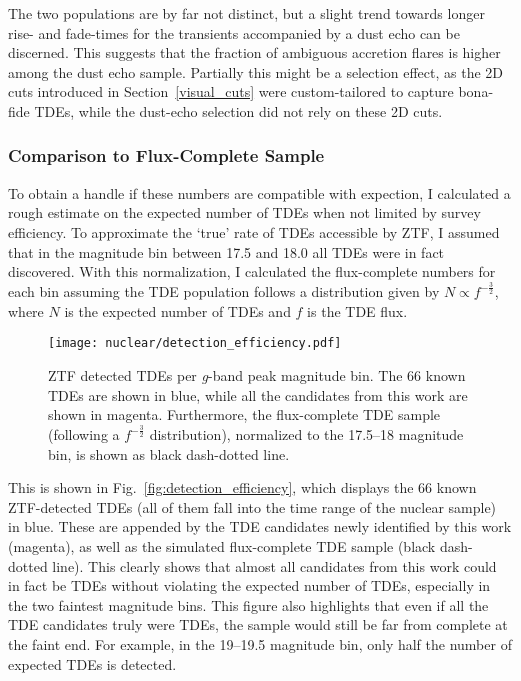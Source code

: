 The two populations are by far not distinct, but a slight trend towards longer rise- and fade-times for the transients accompanied by a dust echo can be discerned. This suggests that the fraction of ambiguous accretion flares is higher among the dust echo sample. Partially this might be a selection effect, as the 2D cuts introduced in Section~\ref{visual_cuts} were custom-tailored to capture bona-fide TDEs, while the dust-echo selection did not rely on these 2D cuts.

\subsubsection{Comparison to Flux-Complete Sample}
To obtain a handle if these numbers are compatible with expection, I calculated a rough estimate on the expected number of TDEs when not limited by survey efficiency. To approximate the `true' rate of TDEs accessible by ZTF, I assumed that in the magnitude bin between 17.5 and 18.0 all TDEs were in fact discovered. With this normalization, I calculated the flux-complete numbers for each bin assuming the TDE population follows a distribution given by $N\propto f^{-\frac{3}{2}}$, where $N$ is the expected number of TDEs and $f$ is the TDE flux.

\begin{figure}[htb]
  \texttt{[image: nuclear/detection\_efficiency.pdf]}
  \caption[ZTF TDE detections per magnitude bin]{ZTF detected TDEs per \textit{g}-band peak magnitude bin. The 66 known TDEs are shown in blue, while all the candidates from this work are shown in magenta. Furthermore, the flux-complete TDE sample (following a $f^{-\frac{3}{2}}$ distribution), normalized to the 17.5--18 magnitude bin, is shown as black dash-dotted line.}
\end{figure}

This is shown in Fig.~\ref{fig:detection_efficiency}, which displays the 66 known ZTF-detected TDEs (all of them fall into the time range of the nuclear sample) in blue. These are appended by the TDE candidates newly identified by this work (magenta), as well as the simulated flux-complete TDE sample (black dash-dotted line). This clearly shows that almost all candidates from this work could in fact be TDEs without violating the expected number of TDEs, especially in the two faintest magnitude bins. This figure also highlights that even if all the TDE candidates truly were TDEs, the sample would still be far from complete at the faint end. For example, in the 19--19.5 magnitude bin, only half the number of expected TDEs is detected.


